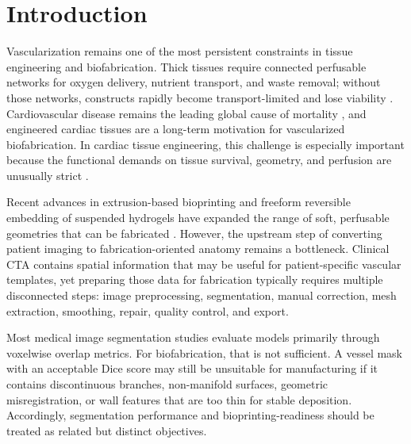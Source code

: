 \documentclass[anonymous]{iopjournal}
\begin{document}
\begin{abstract}
\end{abstract}

\vspace{0.8em}
\date{}
\maketitle

\section{Introduction}

Vascularization remains one of the most persistent constraints in tissue engineering and biofabrication. Thick tissues require connected perfusable networks for oxygen delivery, nutrient transport, and waste removal; without those networks, constructs rapidly become transport-limited and lose viability \cite{murphy2014,lovett2009,rouwkema2016,oconnor2022}. Cardiovascular disease remains the leading global cause of mortality \cite{who,tsao2023}, and engineered cardiac tissues are a long-term motivation for vascularized biofabrication. In cardiac tissue engineering, this challenge is especially important because the functional demands on tissue survival, geometry, and perfusion are unusually strict \cite{murphy2020,noor2019,wu2023}.

Recent advances in extrusion-based bioprinting and freeform reversible embedding of suspended hydrogels have expanded the range of soft, perfusable geometries that can be fabricated \cite{kolesky2014,ozbolat2016,hinton2015}. However, the upstream step of converting patient imaging to fabrication-oriented anatomy remains a bottleneck. Clinical CTA contains spatial information that may be useful for patient-specific vascular templates, yet preparing those data for fabrication typically requires multiple disconnected steps: image preprocessing, segmentation, manual correction, mesh extraction, smoothing, repair, quality control, and export.

Most medical image segmentation studies evaluate models primarily through voxelwise overlap metrics. For biofabrication, that is not sufficient. A vessel mask with an acceptable Dice score may still be unsuitable for manufacturing if it contains discontinuous branches, non-manifold surfaces, geometric misregistration, or wall features that are too thin for stable deposition. Accordingly, segmentation performance and bioprinting-readiness should be treated as related but distinct objectives.
\end{document}
